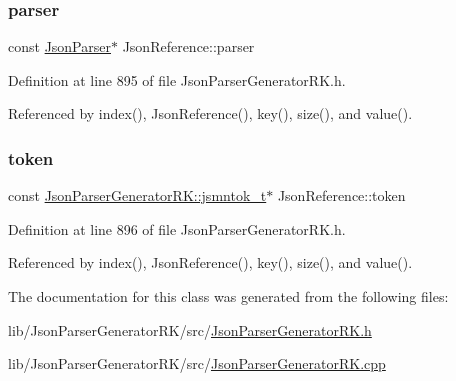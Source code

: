 \subsubsection{\texorpdfstring{parser}{parser}}
{\footnotesize\ttfamily const \hyperlink{class_json_parser}{Json\+Parser}$\ast$ Json\+Reference\+::parser\hspace{0.3cm}{\ttfamily [private]}}



Definition at line 895 of file Json\+Parser\+Generator\+R\+K.\+h.



Referenced by index(), Json\+Reference(), key(), size(), and value().

\mbox{\label{class_json_reference_a895a16fb8f781504fe39efd194ed5232}} 
\subsubsection{\texorpdfstring{token}{token}}
{\footnotesize\ttfamily const \hyperlink{struct_json_parser_generator_r_k_1_1jsmntok__t}{Json\+Parser\+Generator\+R\+K\+::jsmntok\+\_\+t}$\ast$ Json\+Reference\+::token\hspace{0.3cm}{\ttfamily [private]}}



Definition at line 896 of file Json\+Parser\+Generator\+R\+K.\+h.



Referenced by index(), Json\+Reference(), key(), size(), and value().



The documentation for this class was generated from the following files\+:\begin{DoxyCompactItemize}
\item 
lib/\+Json\+Parser\+Generator\+R\+K/src/\hyperlink{_json_parser_generator_r_k_8h}{Json\+Parser\+Generator\+R\+K.\+h}\item 
lib/\+Json\+Parser\+Generator\+R\+K/src/\hyperlink{_json_parser_generator_r_k_8cpp}{Json\+Parser\+Generator\+R\+K.\+cpp}\end{DoxyCompactItemize}
